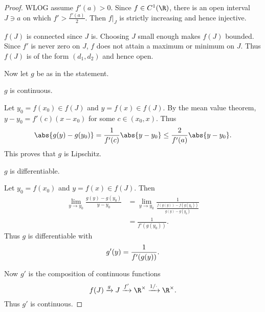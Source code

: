 \begin{proof}
    WLOG assume $f'(a) > 0$.
    Since $f \in C^1(\R)$, there is an open interval $J \ni a$ on which
    $f' > \frac{f'(a)}{2}$.
    Then $f\vert_J$ is strictly increasing and hence injective.

    $f(J)$ is connected since $J$ is.
    Choosing $J$ small enough makes $f(J)$ bounded.
    Since $f'$ is never zero on $J$, $f$ does not attain a maximum or
    minimum on $J$.
    Thus $f(J)$ is of the form $(d_1, d_2)$ and hence open.

    Now let $g$ be as in the statement.
    \begin{claim}
        $g$ is continuous.
    \end{claim}
    \begin{subproof}
        Let $y_0 = f(x_0) \in f(J)$ and $y = f(x) \in f(J)$.
        By the mean value theorem, $y - y_0 = f'(c)(x - x_0)$ for some
        $c \in (x_0, x)$.
        Thus \[
            \abs{g(y) - g(y_0)} = \frac1{f'(c)} \abs{y - y_0}
                \le \frac2{f'(a)} \abs{y - y_0}.
        \] This proves that $g$ is Lipschitz.
    \end{subproof}

    \begin{claim}
        $g$ is differentiable.
    \end{claim}
    \begin{subproof}
        Let $y_0 = f(x_0)$ and $y = f(x) \in f(J)$.
        Then \begin{align*}
            \lim_{y \to y_0} \frac{g(y) - g(y_0)}{y - y_0}
                &= \lim_{y \to y_0} \frac{1}{\frac{f(g(y)) - f(g(y_0))}
                                                    {g(y) - g(y_0)}} \\
                &= \frac1{f'(g(y_0))}.
        \end{align*}
        Thus $g$ is differentiable with \[
            g'(y) = \frac1{f'(g(y))}. \qedhere
        \]
    \end{subproof}
    Now $g'$ is the composition of continuous functions \[
        f(J) \xrightarrow{g} J \xrightarrow{f'} \R^\times
        \xrightarrow{1/\cdot} \R^\times.
    \] Thus $g'$ is continuous.
\end{proof}

